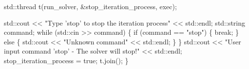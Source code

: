 \begin{DoxyCodeInclude}
    std::thread t(run\_solver, &stop\_iteration\_process, exec);

    std::cout << \textcolor{stringliteral}{"Type 'stop' to stop the iteration process"} << std::endl;
    std::string command;
    \textcolor{keywordflow}{while} (std::cin >> command) \{
        \textcolor{keywordflow}{if} (command == \textcolor{stringliteral}{"stop"}) \{
            \textcolor{keywordflow}{break};
        \} \textcolor{keywordflow}{else} \{
            std::cout << \textcolor{stringliteral}{"Unknown command"} << std::endl;
        \}
    \}
    std::cout << \textcolor{stringliteral}{"User input command 'stop' - The solver will stop!"}
              << std::endl;
    stop\_iteration\_process = \textcolor{keyword}{true};
    t.join();
\}
\end{DoxyCodeInclude}
 